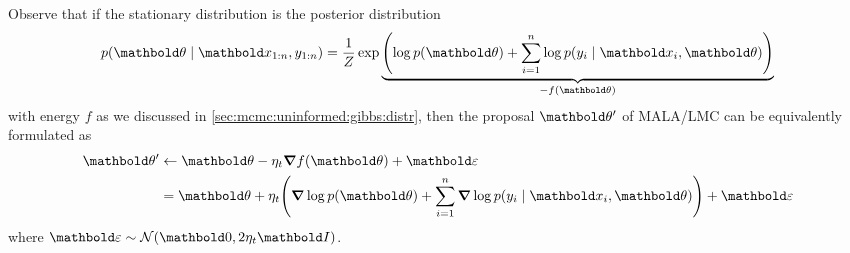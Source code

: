 Observe that if the stationary distribution is the posterior distribution \begin{align*}
  p(\vtheta \mid \vx_{1:n}, y_{1:n}) = \frac{1}{Z} \exp\underbrace{\parentheses*{\log p(\vtheta) + \sum_{i=1}^n \log p(y_i \mid \vx_i, \vtheta)}}_{-f(\vtheta)}
\end{align*} with energy $f$ as we discussed in \cref{sec:mcmc:uninformed:gibbs:distr}, then the proposal $\vtheta'$ of MALA/LMC can be equivalently formulated as \begin{align}\begin{split}
  \vtheta' &\gets \vtheta - \eta_t \grad f(\vtheta) + \vvarepsilon \\
  &= \vtheta + \eta_t \parentheses*{\grad \log p(\vtheta) + \sum_{i=1}^n \grad \log p(y_i \mid \vx_i, \vtheta)} + \vvarepsilon \label{eq:lmc}
\end{split}\end{align} where $\vvarepsilon \sim \N{\vzero}{2\eta_t\mI}$.

